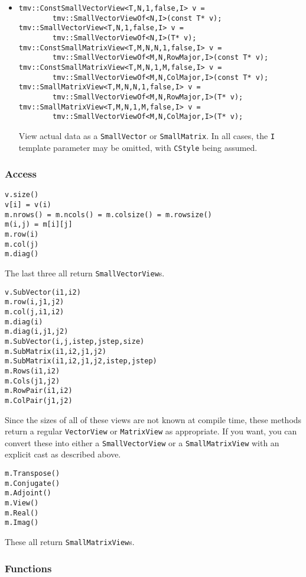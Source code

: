 \documentclass[twoside,letterpaper,11pt]{article}
\renewcommand{\tt}[1]{{\texttt {#1}}}
\begin{document}
\begin{itemize}
\item
\begin{verbatim}
tmv::ConstSmallVectorView<T,N,1,false,I> v =
        tmv::SmallVectorViewOf<N,I>(const T* v);
tmv::SmallVectorView<T,N,1,false,I> v =
        tmv::SmallVectorViewOf<N,I>(T* v);
tmv::ConstSmallMatrixView<T,M,N,N,1,false,I> v =
        tmv::SmallVectorViewOf<M,N,RowMajor,I>(const T* v);
tmv::ConstSmallMatrixView<T,M,N,1,M,false,I> v =
        tmv::SmallVectorViewOf<M,N,ColMajor,I>(const T* v);
tmv::SmallMatrixView<T,M,N,N,1,false,I> v =
        tmv::SmallVectorViewOf<M,N,RowMajor,I>(T* v);
tmv::SmallMatrixView<T,M,N,1,M,false,I> v =
        tmv::SmallVectorViewOf<M,N,ColMajor,I>(T* v);
\end{verbatim}
View actual data as a \tt{SmallVector} or \tt{SmallMatrix}.
In all cases, the \tt{I} template parameter may be omitted, with
\tt{CStyle} being assumed.

\end{itemize}


\subsubsection{Access}

\begin{verbatim}
v.size()
v[i] = v(i)
m.nrows() = m.ncols() = m.colsize() = m.rowsize()
m(i,j) = m[i][j]
m.row(i)
m.col(j)
m.diag()
\end{verbatim}
The last three all return \tt{SmallVectorView}s.

\begin{verbatim}
v.SubVector(i1,i2)
m.row(i,j1,j2)
m.col(j,i1,i2)
m.diag(i)
m.diag(i,j1,j2)
m.SubVector(i,j,istep,jstep,size)
m.SubMatrix(i1,i2,j1,j2)
m.SubMatrix(i1,i2,j1,j2,istep,jstep)
m.Rows(i1,i2)
m.Cols(j1,j2)
m.RowPair(i1,i2)
m.ColPair(j1,j2)
\end{verbatim}
Since the sizes of all of these views are not known at compile time, 
these methods return a regular \tt{VectorView} or \tt{MatrixView} as
appropriate.  If you want, you can convert these into 
either a \tt{SmallVectorView}
or a \tt{SmallMatrixView} with an explicit cast as described above.

\begin{verbatim}
m.Transpose()
m.Conjugate()
m.Adjoint()
m.View()
m.Real()
m.Imag()
\end{verbatim}
These all return \tt{SmallMatrixView}s.

\subsubsection{Functions}
\end{document}
